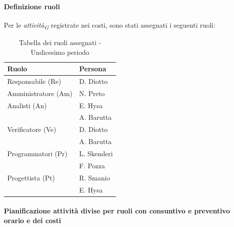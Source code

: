 \paragraph{Definizione ruoli}
Per le \textit{attività}\textsubscript{\textit{G}} registrate nei costi, sono stati assegnati i seguenti ruoli: 

\begin{table}[H]
    \centering
    \begin{tabular}{|L{4cm}|L{2cm}|}
        \hline
        \textbf{Ruolo} & \textbf{Persona} \\
        \hline
        \hline
        Responsabile (Re)   & D. Diotto \\
        \hline
        Amministratore (Am) & N. Preto \\
        \hline
        Analisti (An)       & E. Hysa \\
                            & A. Barutta \\
        \hline
        Verificatore (Ve)   & D. Diotto \\
                            & A. Barutta \\ 
        \hline
        Programmatori (Pr)  & L. Skenderi \\
                            & F. Pozza \\
        \hline
        Progettista (Pt)    & R. Smanio \\
                            & E. Hysa \\
        \hline
    \end{tabular}
    \caption{Tabella dei ruoli assegnati - Undicesimo periodo}
    \label{tab:Ruoli_persone_11}
\end{table}

\paragraph{Pianificazione attività divise per ruoli con consuntivo e preventivo orario e dei costi}

\vspace{0.4cm}

